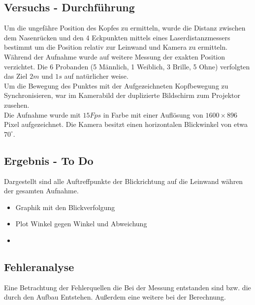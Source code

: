 \subsection{Versuchs - Durchführung}
Um die ungefähre Position des Kopfes zu ermitteln, wurde die Distanz zwischen dem Nasenrücken und den 4 Eckpunkten mittels eines Laserdistanzmessers bestimmt um die Position relativ zur Leinwand und Kamera zu ermitteln.\\
Während der Aufnahme wurde auf weitere Messung der exakten Position verzichtet.
Die 6 Probanden (5 Männlich, 1 Weiblich, 3 Brille, 5 Ohne) verfolgten das Ziel $2m$ und $1s$ auf natürlicher weise.\\
Um die Bewegung des Punktes mit der Aufgezeichneten Kopfbewegung zu Synchronisieren, war im Kamerabild der duplizierte Bildschirm zum Projektor zusehen.\\
Die Aufnahme wurde mit $15Fps$ in Farbe mit einer Auflösung von $1600\times 896$ Pixel aufgezeichnet. Die Kamera besitzt einen horizontalen Blickwinkel von etwa $70^\circ$.
\subsection{Ergebnis - To Do}
Dargestellt sind alle Auftreffpunkte der Blickrichtung auf die Leinwand währen der gesamten Aufnahme.
\begin{itemize}
	\item Graphik mit den Blickverfolgung
	\item Plot Winkel gegen Winkel und Abweichung
	\item 
\end{itemize}
\subsection{Fehleranalyse}
Eine Betrachtung der Fehlerquellen die Bei der Messung entstanden sind bzw. die durch den Aufbau Entstehen. Außerdem eine weitere bei der Berechnung.
